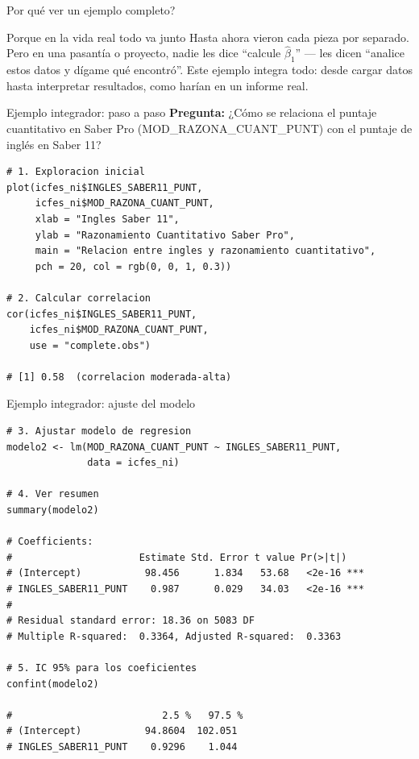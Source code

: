 \documentclass[aspectratio=169, 11pt]{beamer}
\begin{document}
\begin{frame}{\textquestiondown{}Por qu\'e ver un ejemplo completo?}
\begin{exampleblock}{Porque en la vida real todo va junto}
\small
Hasta ahora vieron cada pieza por separado. Pero en una pasant\'ia o proyecto, nadie les dice ``calcule $\hat{\beta}_1$'' --- les dicen ``analice estos datos y d\'igame qu\'e encontr\'o''. Este ejemplo integra todo: desde cargar datos hasta interpretar resultados, como har\'ian en un informe real.
\end{exampleblock}
\end{frame}

\begin{frame}[fragile]{Ejemplo integrador: paso a paso}
\textbf{Pregunta:} ¿Cómo se relaciona el puntaje cuantitativo en Saber Pro (MOD\_RAZONA\_CUANT\_PUNT) con el puntaje de inglés en Saber 11?

\begin{lstlisting}
# 1. Exploracion inicial
plot(icfes_ni$INGLES_SABER11_PUNT,
     icfes_ni$MOD_RAZONA_CUANT_PUNT,
     xlab = "Ingles Saber 11",
     ylab = "Razonamiento Cuantitativo Saber Pro",
     main = "Relacion entre ingles y razonamiento cuantitativo",
     pch = 20, col = rgb(0, 0, 1, 0.3))

# 2. Calcular correlacion
cor(icfes_ni$INGLES_SABER11_PUNT,
    icfes_ni$MOD_RAZONA_CUANT_PUNT,
    use = "complete.obs")

# [1] 0.58  (correlacion moderada-alta)
\end{lstlisting}
\end{frame}

\begin{frame}[fragile]{Ejemplo integrador: ajuste del modelo}
\begin{lstlisting}[basicstyle=\ttfamily\scriptsize]
# 3. Ajustar modelo de regresion
modelo2 <- lm(MOD_RAZONA_CUANT_PUNT ~ INGLES_SABER11_PUNT,
              data = icfes_ni)

# 4. Ver resumen
summary(modelo2)

# Coefficients:
#                      Estimate Std. Error t value Pr(>|t|)
# (Intercept)           98.456      1.834   53.68   <2e-16 ***
# INGLES_SABER11_PUNT    0.987      0.029   34.03   <2e-16 ***
#
# Residual standard error: 18.36 on 5083 DF
# Multiple R-squared:  0.3364, Adjusted R-squared:  0.3363

# 5. IC 95% para los coeficientes
confint(modelo2)

#                          2.5 %   97.5 %
# (Intercept)           94.8604  102.051
# INGLES_SABER11_PUNT    0.9296    1.044
\end{lstlisting}
\end{frame}
\end{document}
